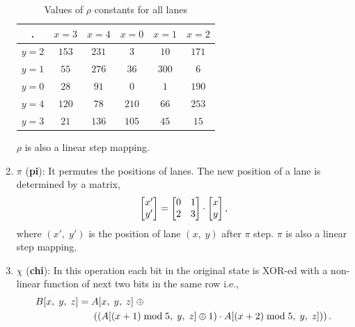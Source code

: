 \begin{enumerate}
        \begin{table}[h!]
            \begin{center}
                \begin{tabular}{c|c|c|c|c|c}
                    \textbf{.} & $x = 3$ & ${x = 4}$ & ${x = 0}$ & ${x = 1}$ & ${x = 2}$\\ %
                    \hline
                    ${y = 2}$ & $153$ & $231$ & $3$ & $10$ & $171$\\ %
                    \hline
                    ${y = 1}$ & $55$ & $276$ & $36$ & $300$ & $6$\\ %
                    \hline
                    ${y = 0}$ & $28$ & $91$ & $0$ & $1$ & $190$\\ %
                    \hline
                    ${y = 4}$ & $120$ & $78$ & $210$ & $66$ & $253$\\ %
                    \hline
                    ${y = 3}$ & $21$ & $136$ & $105$ & $45$ & $15$\\ %
                    \hline
                \end{tabular}
                \caption{Values of $\rho$ constants for all lanes}\label{tab4}
            \end{center}
        \end{table}                                                                 
        $\rho$ is also a linear step mapping.

    \vskip5pt
    \item $\pi$ ({\bf pi}): It permutes the positions of lanes. The new position of a lane is determined by a matrix, 
    \begin{align}
    \begin{bmatrix} x'\\ y'\end{bmatrix} = 
    \begin{bmatrix} $0$ & $1$ \\ $2$ &  $3$ \end{bmatrix} \cdot \begin{bmatrix} x\\ y\end{bmatrix},
    \end{align}
    where $(x',\; y')$ is the position of lane $(x,\; y)$ after $\pi$ step.
        $\pi$ is also a linear step mapping.
    \vskip5pt
    \item $\chi$ ({\bf chi}): In this operation each bit in the original state is XOR-ed with a non-linear function of next two bits in the same row i.e.,
    \begin{align}\nonumber
        B[x,\; y,\; z] &=  A[x,\; y,\; z] \;\oplus \\
        & \hspace{0.5cm} \left( \left(A[ (x + 1 )\bmod 5,\; y,\; z] \oplus 1\right) \cdot  A[ (x + 2) \bmod 5,\; y,\; z] ) \right).
    \end{align}
    

\end{enumerate}

